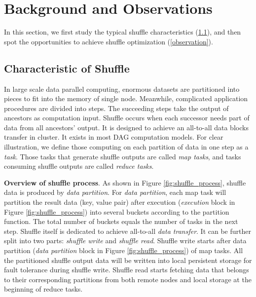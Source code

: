 \section{Background and Observations}

In this section, we first study the typical shuffle characteristics (\ref{shuffle pattern}), and then spot the opportunities to achieve shuffle optimization (\ref{observation}).
\subsection{Characteristic of Shuffle} \label{shuffle pattern}

In large scale data parallel computing, enormous datasets are partitioned into pieces to fit into the memory of single node.
Meanwhile, complicated application procedures are divided into steps. The succeeding steps take the output of ancestors as computation input. Shuffle occurs when each successor needs
part of data from all ancestors' output. It is designed to achieve an all-to-all data blocks transfer in cluster. It exists in most DAG computation models.
For clear illustration, we define those computing on each partition of data in one step as a \textit{task}.
Those tasks that generate shuffle outputs are called \textit{map tasks}, and tasks consuming shuffle outputs are called \textit{reduce tasks}.

\textbf{Overview of shuffle process}. As shown in Figure \ref{fig:shuffle_process}, shuffle data is produced by \textit{data partition}. For \textit{data partition}, each map task will partition the result data (key, value pair) after execution (\textit{execution} block in Figure \ref{fig:shuffle_process}) into several buckets according to the partition function.
The total number of buckets equals the number of tasks in the next step.
Shuffle itself is dedicated to achieve all-to-all \textit{data transfer}.
It can be further split into two parts: \textit{shuffle write} and \textit{shuffle read}. Shuffle write starts after data partition (\textit{data partition} block in Figure \ref{fig:shuffle_process}) of map tasks.
All the partitioned shuffle output data will be written into local persistent storage for fault tolerance \cite{mapreduce, spark} during shuffle write.
Shuffle read starts fetching data that belongs to their corresponding partitions from both remote nodes and local storage at the beginning of reduce tasks.

